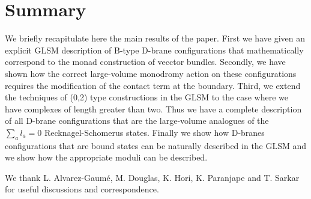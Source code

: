 \documentclass[a4paper,12pt]{article}
\begin{document}
\section{Summary}

We briefly recapitulate here the main results of the paper. 
First we
have given an explicit GLSM description of B-type D-brane configurations
that mathematically correspond to the monad construction of vecctor 
bundles. Secondly, we have shown how the correct large-volume 
monodromy action on these configurations requires the modification of 
the contact term at the boundary. Third, we extend the techniques of
(0,2) type constructions in the GLSM to the case where we have complexes
of length greater than two. Thus we have a complete description of all
D-brane configurations that are the large-volume analogues of the
$\sum_a l_a=0$ Recknagel-Schomerus states. Finally we show how D-branes
configurations that are bound
states can be naturally described in the GLSM and we show how the
appropriate moduli can be described. 

 We thank L. Alvarez-Gaum\'e, M. Douglas,
K. Hori, K. Paranjape and T. Sarkar for useful discussions and
correspondence.
\end{document}
